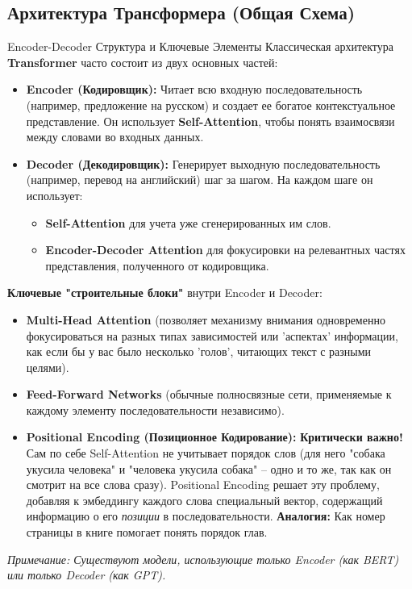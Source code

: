 \subsection{Архитектура Трансформера (Общая Схема)}

\begin{textbox}{Encoder-Decoder Структура и Ключевые Элементы}
    Классическая архитектура \textbf{Transformer} часто состоит из двух основных частей:
    \begin{itemize}
        \item \textbf{Encoder (Кодировщик):} Читает всю входную последовательность (например, предложение на русском) и создает ее богатое контекстуальное представление. Он использует \textbf{Self-Attention}, чтобы понять взаимосвязи между словами во входных данных.
        \item \textbf{Decoder (Декодировщик):} Генерирует выходную последовательность (например, перевод на английский) шаг за шагом. На каждом шаге он использует:
            \begin{itemize}
                \item \textbf{Self-Attention} для учета уже сгенерированных им слов.
                \item \textbf{Encoder-Decoder Attention} для фокусировки на релевантных частях представления, полученного от кодировщика.
            \end{itemize}
    \end{itemize}
    \textbf{Ключевые "строительные блоки"} внутри Encoder и Decoder:
    \begin{itemize}
        \item \textbf{Multi-Head Attention} (позволяет механизму внимания одновременно фокусироваться на разных типах зависимостей или 'аспектах' информации, как если бы у вас было несколько 'голов', читающих текст с разными целями).
        \item \textbf{Feed-Forward Networks} (обычные полносвязные сети, применяемые к каждому элементу последовательности независимо).
        \item \textbf{Positional Encoding (Позиционное Кодирование):} \textbf{Критически важно!} Сам по себе Self-Attention не учитывает порядок слов (для него "собака укусила человека" и "человека укусила собака" – одно и то же, так как он смотрит на все слова сразу). Positional Encoding решает эту проблему, добавляя к эмбеддингу каждого слова специальный вектор, содержащий информацию о его \textit{позиции} в последовательности. \textbf{Аналогия:} Как номер страницы в книге помогает понять порядок глав.
    \end{itemize}
    \textit{Примечание: Существуют модели, использующие только Encoder (как BERT) или только Decoder (как GPT).}
\end{textbox}

